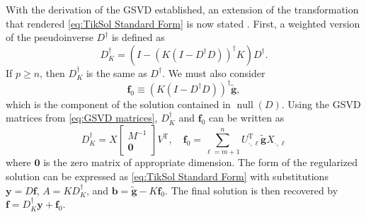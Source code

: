 \documentclass[12pt,notitlepage]{report}
\newcommand{\gnoiseVec}{\widetilde{\mathbf{g}}}	%
\newcommand{\kMat}{K}	%
\newcommand{\fVec}{\mathbf{f}}	%
\newcommand{\trans}{\mathrm{T}}	%
\DeclareMathOperator{\nullspace}{null}	%
\newcommand{\regparam}{\alpha}
\newcommand{\ToDo}[1]{\textcolor{green}{\textbf{#1}}}
\begin{document}
With the derivation of the GSVD established, an extension of the transformation that rendered \eqref{eq:TikSol Standard Form} is now stated \cite[p.~38]{Hansen:98}. First, a weighted version of the pseudoinverse $D^\dagger$ is defined as
\[D_{\kMat}^\dagger = \left(I - \left(\kMat\left(I - D^\dagger D\right)\right)^\dagger \kMat\right)D^\dagger.\]
If $p \geq n$, then $D_{\kMat}^\dagger$ is the same as $D^\dagger$. We must also consider
\[\fVec_0 \equiv \left(\kMat\left(I - D^\dagger D\right)\right)^\dagger \gnoiseVec,\]
which is the component of the solution contained in $\nullspace(D)$.  Using the GSVD matrices from \eqref{eq:GSVD matrices}, $D_{\kMat}^\dagger$ and $\fVec_0$ can be written as
\begin{equation}
\label{eq:Trans. 1}
D_{\kMat}^\dagger = X \begin{bmatrix}
M^{-1} \\
\mathbf{0}
\end{bmatrix}V^\trans, \quad \fVec_0 = \sum_{\ell=m+1}^{n} U_{\cdot,\ell}^\trans\gnoiseVec X_{\cdot,\ell}
\end{equation}
where $\bm{0}$ is the zero matrix of appropriate dimension. The form of the regularized solution can be expressed as \eqref{eq:TikSol Standard Form} with substitutions $\mathbf{y} = D\fVec$, $A = \kMat{D_{\kMat}^\dagger}$, and $\mathbf{b} = \gnoiseVec - \kMat\fVec_0$. 
The final solution is then recovered by $\fVec = D_{\kMat}^\dagger \mathbf{y} + \fVec_0$. 
\end{document}
